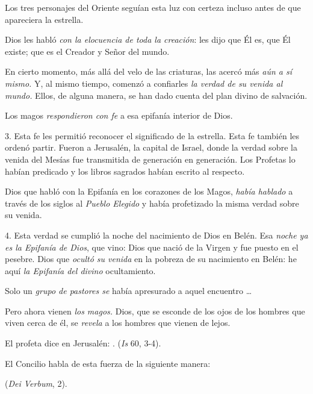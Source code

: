 \begin{body}
	Los tres personajes del Oriente seguían esta luz con certeza incluso antes de que apareciera la estrella.

	Dios les habló \emph{con la elocuencia de toda la creación}: les dijo que Él es, que Él existe; que es el Creador y Señor del mundo.

	En cierto momento, más allá del velo de las criaturas, las acercó más \emph{aún a sí mismo.} Y, al mismo tiempo, comenzó a confiarles \emph{la verdad de su venida al mundo.} Ellos, de alguna manera, se han dado cuenta del plan divino de salvación.

	Los magos \emph{respondieron con fe} a esa epifanía interior de Dios.

	3. Esta fe les permitió reconocer el significado de la estrella. Esta fe también les ordenó partir. Fueron a Jerusalén, la capital de Israel, donde la verdad sobre la venida del Mesías fue transmitida de generación en generación. Los Profetas lo habían predicado y los libros sagrados habían escrito al respecto.

	Dios que habló con la Epifanía en los corazones de los Magos, \emph{había hablado} a través de los siglos al \emph{Pueblo Elegido} y había profetizado la misma verdad sobre su venida.

	4. Esta verdad se cumplió la noche del nacimiento de Dios en Belén. Esa \emph{noche ya es la Epifanía de Dios}, que vino: Dios que nació de la Virgen y fue puesto en el pesebre. Dios que \emph{ocultó su venida} en la pobreza de su nacimiento en Belén: he aquí \emph{la Epifanía del divino} ocultamiento.

	Solo un \emph{grupo de pastores se} había apresurado a aquel encuentro \ldots{}

	Pero ahora vienen \emph{los magos.} Dios, que se esconde de los ojos de los hombres que viven cerca de él, se \emph{revela} a los hombres que vienen de lejos.

	El profeta dice en Jerusalén: . (\emph{Is} 60, 3-4).

	El Concilio habla de esta fuerza de la siguiente manera:

	 (\emph{Dei Verbum}, 2).


\end{body}
